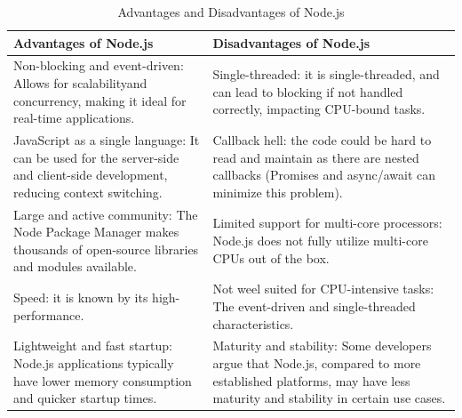 \begin{table}[H]
    \centering
    \begin{tabularx}{\textwidth}{|X|X|}
        \hline
        \textbf{Advantages of Node.js}                                                                                                               & \textbf{Disadvantages of Node.js}                                                                                                                              \\
        \hline
        Non-blocking and event-driven: Allows for scalabilityand concurrency, making it ideal for real-time applications.                    & Single-threaded: it is single-threaded, and can lead to blocking if not handled correctly, impacting CPU-bound tasks.                                   \\
        \hline
        JavaScript as a single language: It can be used for the server-side and client-side development, reducing context switching. & Callback hell: the code could be hard to read and maintain as there are nested callbacks (Promises and async/await can minimize this problem).                      \\
        \hline
        Large and active community: The Node Package Manager makes thousands of open-source libraries and modules available.                 & Limited support for multi-core processors: Node.js does not fully utilize multi-core CPUs out of the box.                                                      \\
        \hline
        Speed: it is known by its high-performance.                                               & Not weel suited for CPU-intensive tasks: The event-driven and single-threaded characteristics.           \\
        \hline
        Lightweight and fast startup: Node.js applications typically have lower memory consumption and quicker startup times.                        & Maturity and stability: Some developers argue that Node.js, compared to more established platforms, may have less maturity and stability in certain use cases. \\
        \hline
    \end{tabularx}
    \label{tab:node-js-advantages-disadvantages}
    \caption{Advantages and Disadvantages of Node.js}
\end{table}



